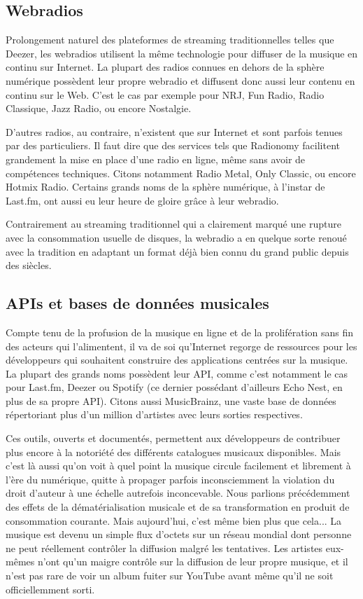 \documentclass[a4paper,12pt]{article}
\begin{document}
\subsection{Webradios}

Prolongement naturel des plateformes de streaming traditionnelles telles que Deezer, les webradios utilisent la même technologie pour diffuser de la musique en continu sur Internet. La plupart des radios connues en dehors de la sphère numérique possèdent leur propre webradio et diffusent donc aussi leur contenu en continu sur le Web. C'est le cas par exemple pour NRJ, Fun Radio, Radio Classique, Jazz Radio, ou encore Nostalgie. 

D'autres radios, au contraire, n'existent que sur Internet et sont parfois tenues par des particuliers. Il faut dire que des services tels que Radionomy facilitent grandement la mise en place d'une radio en ligne, même sans avoir de compétences techniques. Citons notamment Radio Metal, Only Classic, ou encore Hotmix Radio. Certains grands noms de la sphère numérique, à l'instar de Last.fm, ont aussi eu leur heure de gloire grâce à leur webradio.

Contrairement au streaming traditionnel qui a clairement marqué une rupture avec la consommation usuelle de disques, la webradio a en quelque sorte renoué avec la tradition en adaptant un format déjà bien connu du grand public depuis des siècles.

\subsection{APIs et bases de données musicales}

Compte tenu de la profusion de la musique en ligne et de la prolifération sans fin des acteurs qui l'alimentent, il va de soi qu'Internet regorge de ressources pour les développeurs qui souhaitent construire des applications centrées sur la musique. La plupart des grands noms possèdent leur API, comme c'est notamment le cas pour Last.fm, Deezer ou Spotify (ce dernier possédant d'ailleurs Echo Nest, en plus de sa propre API). Citons aussi MusicBrainz, une vaste base de données répertoriant plus d'un million d'artistes avec leurs sorties respectives.

Ces outils, ouverts et documentés, permettent aux développeurs de contribuer plus encore à la notoriété des différents catalogues musicaux disponibles. Mais c'est là aussi qu'on voit à quel point la musique circule facilement et librement à l'ère du numérique, quitte à propager parfois inconsciemment la violation du droit d'auteur à une échelle autrefois inconcevable. Nous parlions précédemment des effets de la dématérialisation musicale et de sa transformation en produit de consommation courante. Mais aujourd'hui, c'est même bien plus que cela... La musique est devenu un simple flux d'octets sur un réseau mondial dont personne ne peut réellement contrôler la diffusion malgré les tentatives. Les artistes eux-mêmes n'ont qu'un maigre contrôle sur la diffusion de leur propre musique, et il n'est pas rare de voir un album fuiter sur YouTube avant même qu'il ne soit officiellemment sorti.
\end{document}
